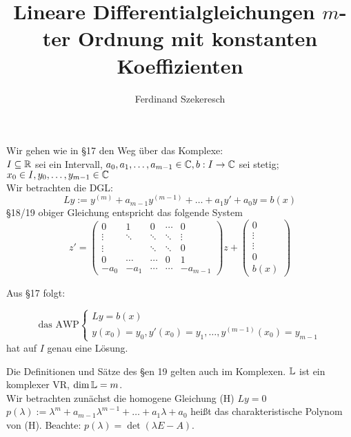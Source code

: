 \documentclass{article}
\title{Lineare Differentialgleichungen $m$-ter Ordnung mit konstanten Koeffizienten}
\author{Ferdinand Szekeresch}
\begin{document}
\maketitle

Wir gehen wie in §17 den Weg über das Komplexe: \\
$I \subseteq \mathbb{R}$ sei ein Intervall, $a_0, a_1, \ldots, a_{m-1} \in \mathbb{C}, b: I \rightarrow \mathbb{C}$ sei stetig;$ x_0 \in I, y_0, \ldots, y_{m-1} \in \mathbb{C}$ \\
Wir betrachten die DGL:
$$Ly := y^{(m)} + a_{m-1}y^{(m-1)} + \ldots + a_1y' + a_0y = b(x)$$
§18/19 obiger Gleichung entspricht das folgende System
$$z' = \begin{pmatrix}
0 	& 1 	 & 0 	  & \cdots & 0 \\ 
\vdots 	& \ddots & \ddots & \ddots & \vdots \\
\vdots 	& 	 & \ddots & \ddots & 0 \\
0	& \cdots & \cdots & 0	   & 1 \\
-a_0	& -a_1	 & \cdots & \cdots & -a_{m-1} \end{pmatrix}z + \begin{pmatrix}0 \\ \vdots \\ \vdots \\ 0 \\ b(x) \end{pmatrix}$$

Aus §17 folgt:

\begin{satz} %
\begin{liste}
\item $$\text{das AWP} \begin{cases} Ly = b(x) \\ y(x_0) = y_0, y'(x_0) = y_1, \ldots, y^{(m-1)}(x_0) = y_{m-1}\end{cases}$$ hat auf $I$ genau eine Lösung.
\item Die Definitionen und Sätze des §en 19 gelten auch im Komplexen. $\mathbb{L}$ ist ein komplexer VR, $\dim\mathbb{L} = m$. \\
Wir betrachten zunächst die homogene Gleichung (H) $Ly=0$ \\
$p(\lambda) := \lambda ^m + a_{m-1}\lambda ^{m-1} + \ldots + a_1\lambda + a_0$ heißt das charakteristische Polynom von (H). Beachte: $p(\lambda) = \det (\lambda E - A)$.
\end{liste}
\end{satz}
\end{document}
